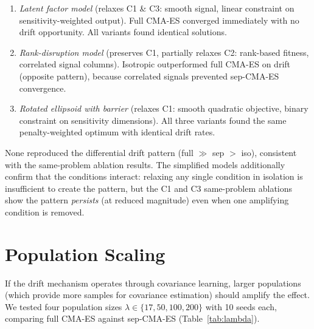 \documentclass[twoside,11pt]{article}
\begin{document}
\begin{enumerate}
\item \emph{Latent factor model} (relaxes C1 \& C3: smooth signal, linear
  constraint on sensitivity-weighted output). Full CMA-ES converged immediately
  with no drift opportunity. All variants found identical solutions.

\item \emph{Rank-disruption model} (preserves C1, partially relaxes C2:
  rank-based fitness, correlated signal columns). Isotropic outperformed full
  CMA-ES on drift (opposite pattern), because correlated signals prevented
  sep-CMA-ES convergence.

\item \emph{Rotated ellipsoid with barrier} (relaxes C1: smooth quadratic
  objective, binary constraint on sensitivity dimensions). All three variants
  found the same penalty-weighted optimum with identical drift rates.
\end{enumerate}

None reproduced the differential drift pattern (full $\gg$ sep $>$ iso),
consistent with the same-problem ablation results. The simplified models
additionally confirm that the conditions interact: relaxing any
single condition in isolation is insufficient to create the pattern, but
the C1 and C3 same-problem ablations show the pattern \emph{persists} (at
reduced magnitude) even when one amplifying condition is removed.

\section{Population Scaling}
\label{sec:lambda}

If the drift mechanism operates through covariance learning, larger populations
(which provide more samples for covariance estimation) should amplify the
effect. We tested four population sizes $\lambda \in \{17, 50, 100, 200\}$
with 10 seeds each, comparing full CMA-ES against sep-CMA-ES
(Table~\ref{tab:lambda}).
\end{document}
